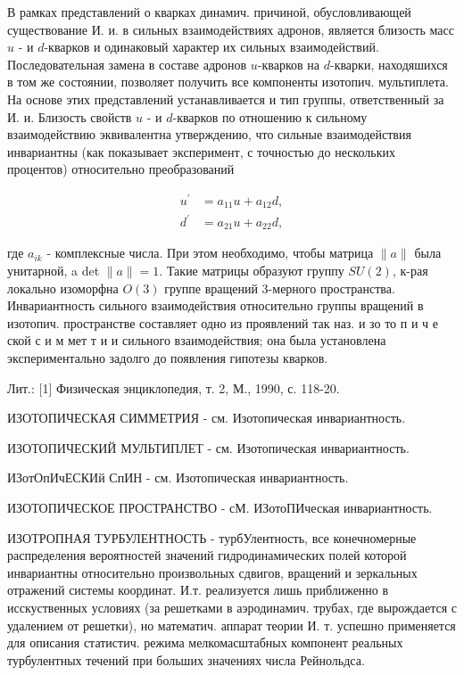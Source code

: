 \documentclass[10pt]{article}
\begin{document}
В рамках представлений о кварках динамич. причиной, обусловливающей существование И. и. в сильных взаимодействиях адронов, является близость масс $u$ - и $d$-кварков и одинаковый характер их сильных взаимодействий. Последовательная замена в составе адронов $u$-кварков на $d$-кварки, находяшихся в том же состоянии, позволяет получить все компоненты изотопич. мультиплета. На основе этих представлений устанавливается и тип группы, ответственный за И. и. Близость свойств $u$ - и $d$-кварков по отношению к сильному взаимодействию эквивалентна утверждению, что сильные взаимодействия инвариантны (как показывает эксперимент, с точностью до нескольких процентов) относительно преобразований



\[

\begin{aligned}

u^{\prime} & =a_{11} u+a_{12} d, \\

d^{\prime} & =a_{21} u+a_{22} d,

\end{aligned}

\]



где $a_{i k}$ - комплексные числа. При этом необходимо, чтобы матрица $\|a\|$ была унитарной, a det $\|a\|=1$. Такие матрицы образуют группу $S U(2)$, к-рая локально изоморфна $O(3)$ группе вращений 3-мерного пространства. Инвариантность сильного взаимодействия относительно группы вращений в изотопич. пространстве составляет одно из проявлений так наз. и зо то п и ч е ской с и м мет т и и сильного взаимодействия; она была установлена экспериментально задолго до появления гипотезы кварков.



Лит.: [1] Физическая энциклопедия, т. 2, М., 1990, с. 118-20.



ИЗОТОПИЧЕСКАЯ СИММЕТРИЯ - см. Изотопическая инвариантность.



ИЗОТОПИЧЕСКИЙ МУЛЬТИПЛЕТ - см. Изотопическая инвариантность.



ИЗотОпИчЕСКИй СпИН - см. Изотопическая инвариантность.



ИЗОТОПИЧЕСКОЕ ПРОСТРАНСТВО - сМ. ИЗотоПИческая инвариантность.



ИЗОТРОПНАЯ ТУРБУЛЕНТНОСТЬ - турбУлентность, все конечномерные распределения вероятностей значений гидродинамических полей которой инвариантны относительно произвольных сдвигов, вращений и зеркальных отражений системы координат. И.т. реализуется лишь приближенно в исскуственных условиях (за решетками в аэродинамич. трубах, где вырождается с удалением от решетки), но математич. аппарат теории И. т. успешно применяется для описания статистич. режима мелкомасштабных компонент реальных турбулентных течений при больших значениях числа Рейнольдса.
\end{document}
